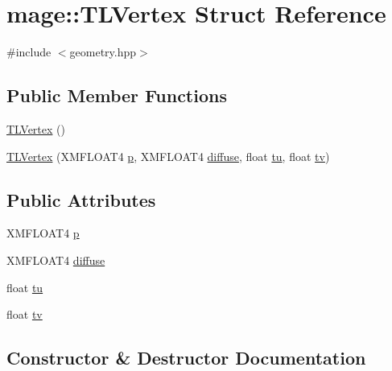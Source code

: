 \hypertarget{structmage_1_1_t_l_vertex}{}\section{mage\+:\+:T\+L\+Vertex Struct Reference}
\label{structmage_1_1_t_l_vertex}


{\ttfamily \#include $<$geometry.\+hpp$>$}

\subsection*{Public Member Functions}
\begin{DoxyCompactItemize}
\item 
\hyperlink{structmage_1_1_t_l_vertex_a281016b2cd959f1084fb69292b2e0609}{T\+L\+Vertex} ()
\item 
\hyperlink{structmage_1_1_t_l_vertex_a13e51ade415e514fce0065684e69b639}{T\+L\+Vertex} (X\+M\+F\+L\+O\+A\+T4 \hyperlink{structmage_1_1_t_l_vertex_a5ac68e9f9767dae9455134891712baf1}{p}, X\+M\+F\+L\+O\+A\+T4 \hyperlink{structmage_1_1_t_l_vertex_a78d60c6622bc1091f2c1c30da0715236}{diffuse}, float \hyperlink{structmage_1_1_t_l_vertex_a33bec24f83d1daf690caf2ca2ead933b}{tu}, float \hyperlink{structmage_1_1_t_l_vertex_aa82b030c0de9e7fe2403b6f540b2149b}{tv})
\end{DoxyCompactItemize}
\subsection*{Public Attributes}
\begin{DoxyCompactItemize}
\item 
X\+M\+F\+L\+O\+A\+T4 \hyperlink{structmage_1_1_t_l_vertex_a5ac68e9f9767dae9455134891712baf1}{p}
\item 
X\+M\+F\+L\+O\+A\+T4 \hyperlink{structmage_1_1_t_l_vertex_a78d60c6622bc1091f2c1c30da0715236}{diffuse}
\item 
float \hyperlink{structmage_1_1_t_l_vertex_a33bec24f83d1daf690caf2ca2ead933b}{tu}
\item 
float \hyperlink{structmage_1_1_t_l_vertex_aa82b030c0de9e7fe2403b6f540b2149b}{tv}
\end{DoxyCompactItemize}


\subsection{Constructor \& Destructor Documentation}
\hypertarget{structmage_1_1_t_l_vertex_a281016b2cd959f1084fb69292b2e0609}{}\label{structmage_1_1_t_l_vertex_a281016b2cd959f1084fb69292b2e0609} 

